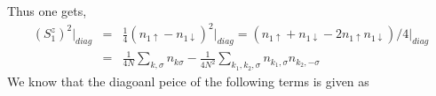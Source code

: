 \documentclass[reprint,prb,superscriptaddress]{revtex4-1}
\begin{document}
Thus one gets,
\begin{eqnarray}
(S_1^z)^2 \bigg|_{diag} &=& \frac{1}{4} (n_{1\uparrow}-n_{1\downarrow})^2\bigg|_{diag}=(n_{1\uparrow}+n_{1\downarrow}-2n_{1\uparrow}n_{1\downarrow})/4 \bigg|_{diag}\nonumber\\
&=& \frac{1}{4N} \displaystyle\sum_{k,\sigma} n_{k\sigma}-\frac{1}{4N^2} \displaystyle\sum_{k_1,k_2,\sigma} n_{k_1,\sigma} n_{k_2,-\sigma}
\end{eqnarray}
We know that the diagoanl peice of the following terms is given as
\end{document}

